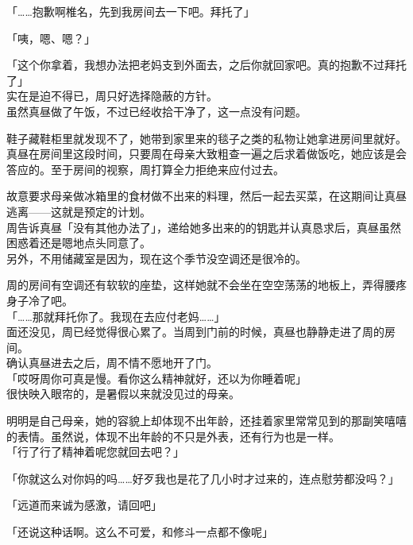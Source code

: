 「……抱歉啊椎名，先到我房间去一下吧。拜托了」

「咦，嗯、嗯？」

「这个你拿着，我想办法把老妈支到外面去，之后你就回家吧。真的抱歉不过拜托了」\\

实在是迫不得已，周只好选择隐蔽的方针。\\

虽然真昼做了午饭，不过已经收拾干净了，这一点没有问题。

鞋子藏鞋柜里就发现不了，她带到家里来的毯子之类的私物让她拿进房间里就好。\\

真昼在房间里这段时间，只要周在母亲大致粗查一遍之后求着做饭吃，她应该是会答应的。至于房间的视察，周打算全力拒绝来应付过去。

故意要求母亲做冰箱里的食材做不出来的料理，然后一起去买菜，在这期间让真昼逃离——这就是预定的计划。\\

周告诉真昼「没有其他办法了」，递给她多出来的的钥匙并认真恳求后，真昼虽然困惑着还是嗯地点头同意了。\\

另外，不用储藏室是因为，现在这个季节没空调还是很冷的。

周的房间有空调还有软软的座垫，这样她就不会坐在空空荡荡的地板上，弄得腰疼身子冷了吧。\\

「……那就拜托你了。我现在去应付老妈……」\\

面还没见，周已经觉得很心累了。当周到门前的时候，真昼也静静走进了周的房间。\\

确认真昼进去之后，周不情不愿地开了门。\\

「哎呀周你可真是慢。看你这么精神就好，还以为你睡着呢」\\

很快映入眼帘的，是暑假以来就没见过的母亲。

明明是自己母亲，她的容貌上却体现不出年龄，还挂着家里常常见到的那副笑嘻嘻的表情。虽然说，体现不出年龄的不只是外表，还有行为也是一样。\\

「行了行了精神着呢您就回去吧？」

「你就这么对你妈的吗……好歹我也是花了几小时才过来的，连点慰劳都没吗？」

「远道而来诚为感激，请回吧」

「还说这种话啊。这么不可爱，和修斗一点都不像呢」

